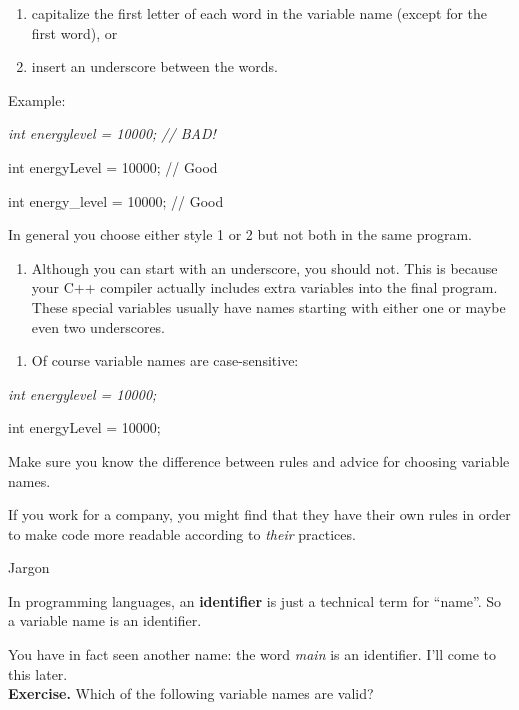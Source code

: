 \documentclass[
]{article}
\providecommand{\tightlist}{%
  \setlength{\itemsep}{0pt}\setlength{\parskip}{0pt}}
\begin{document}
\begin{enumerate}
\def\labelenumi{\arabic{enumi}.}
\tightlist
\item
  capitalize the first letter of each word in the variable name (except
  for the first word), or
\item
  insert an underscore between the words.
\end{enumerate}

Example:

\emph{int energylevel = 10000; // BAD!}

int energyLevel = 10000; // Good

int energy\_level = 10000; // Good

In general you choose either style 1 or 2 but not both in the same
program.

\begin{enumerate}
\def\labelenumi{\arabic{enumi}.}
\setcounter{enumi}{4}
\tightlist
\item
  Although you can start with an underscore, you should not. This is
  because your C++ compiler actually includes extra variables into the
  final program. These special variables usually have names starting
  with either one or maybe even two underscores.
\end{enumerate}

\begin{enumerate}
\def\labelenumi{\arabic{enumi}.}
\setcounter{enumi}{4}
\tightlist
\item
  Of course variable names are case-sensitive:
\end{enumerate}

\emph{int energylevel = 10000;}

int energyLevel = 10000;

Make sure you know the difference between rules and advice for choosing
variable names.

If you work for a company, you might find that they have their own rules
in order to make code more readable according to \emph{their} practices.

Jargon

In programming languages, an \textbf{identifier} is just a technical
term for ``name''. So a variable name is an identifier.

You have in fact seen another name: the word \emph{main} is an
identifier. I'll come to this later.\\

\textbf{Exercise.} Which of the following variable names are valid?
\end{document}
